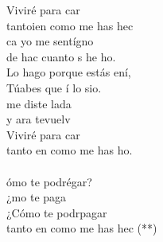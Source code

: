 \begin{cancion}
\begin{chorus}
	Viviré para car \\
	tantoien como me has hec \\
	ca yo me sentígno \\
	de hac cuanto s he ho.\\
	Lo hago porque estás ení, \\
	Túabes que í lo sio.\\
	 me diste lada \\
	y ara tevuelv\\
	Viviré para car\\
	tanto en como me has ho.\\
\jump\\
	ómo te podrégar?\\
	¿mo te paga  \\
	¿Cómo te podrpagar \\
	tanto en como me has hec (**)\\
	\end{chorus}%
	\jump\\
\end{cancion}%
